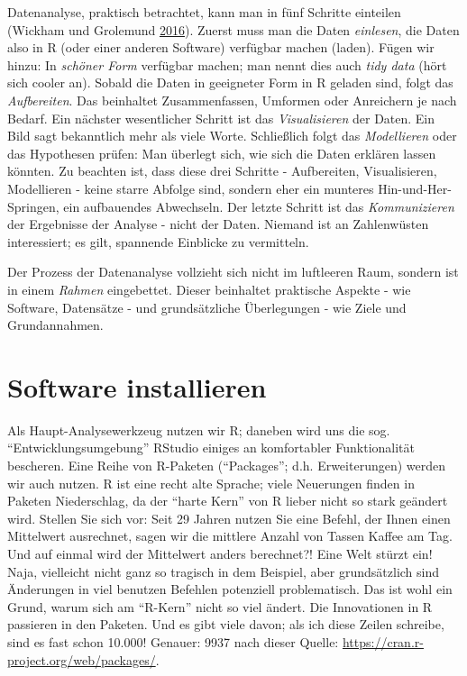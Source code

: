 \documentclass[12pt,ngerman,]{book}
\begin{document}
Datenanalyse, praktisch betrachtet, kann man in fünf Schritte einteilen
(Wickham und Grolemund \protect\hyperlink{ref-r4ds}{2016}). Zuerst muss
man die Daten \emph{einlesen}, die Daten also in R (oder einer anderen
Software) verfügbar machen (laden). Fügen wir hinzu: In \emph{schöner
Form} verfügbar machen; man nennt dies auch \emph{tidy data} (hört sich
cooler an). Sobald die Daten in geeigneter Form in R geladen sind, folgt
das \emph{Aufbereiten}. Das beinhaltet Zusammenfassen, Umformen oder
Anreichern je nach Bedarf. Ein nächster wesentlicher Schritt ist das
\emph{Visualisieren} der Daten. Ein Bild sagt bekanntlich mehr als viele
Worte. Schließlich folgt das \emph{Modellieren} oder das Hypothesen
prüfen: Man überlegt sich, wie sich die Daten erklären lassen könnten.
Zu beachten ist, dass diese drei Schritte - Aufbereiten, Visualisieren,
Modellieren - keine starre Abfolge sind, sondern eher ein munteres
Hin-und-Her-Springen, ein aufbauendes Abwechseln. Der letzte Schritt ist
das \emph{Kommunizieren} der Ergebnisse der Analyse - nicht der Daten.
Niemand ist an Zahlenwüsten interessiert; es gilt, spannende Einblicke
zu vermitteln.

Der Prozess der Datenanalyse vollzieht sich nicht im luftleeren Raum,
sondern ist in einem \emph{Rahmen} eingebettet. Dieser beinhaltet
praktische Aspekte - wie Software, Datensätze - und grundsätzliche
Überlegungen - wie Ziele und Grundannahmen.

\section{Software installieren}\label{software-installieren}

Als Haupt-Analysewerkzeug nutzen wir R; daneben wird uns die sog.
``Entwicklungsumgebung'' RStudio einiges an komfortabler Funktionalität
bescheren. Eine Reihe von R-Paketen (``Packages''; d.h. Erweiterungen)
werden wir auch nutzen. R ist eine recht alte Sprache; viele Neuerungen
finden in Paketen Niederschlag, da der ``harte Kern'' von R lieber nicht
so stark geändert wird. Stellen Sie sich vor: Seit 29 Jahren nutzen Sie
eine Befehl, der Ihnen einen Mittelwert ausrechnet, sagen wir die
mittlere Anzahl von Tassen Kaffee am Tag. Und auf einmal wird der
Mittelwert anders berechnet?! Eine Welt stürzt ein! Naja, vielleicht
nicht ganz so tragisch in dem Beispiel, aber grundsätzlich sind
Änderungen in viel benutzen Befehlen potenziell problematisch. Das ist
wohl ein Grund, warum sich am ``R-Kern'' nicht so viel ändert. Die
Innovationen in R passieren in den Paketen. Und es gibt viele davon; als
ich diese Zeilen schreibe, sind es fast schon 10.000! Genauer: 9937 nach
dieser Quelle: \url{https://cran.r-project.org/web/packages/}.
\end{document}

